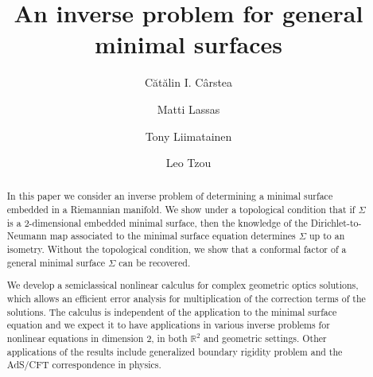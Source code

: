 \documentclass[12pt]{amsart}
\title{An inverse problem for general minimal surfaces}
\author[C. Cârstea]{Cătălin I. Cârstea}
\author[M. Lassas]{Matti Lassas}
\author[T. Liimatainen]{Tony Liimatainen}
\author[L. Tzou]{Leo Tzou}
\def\R{\mathbb R}
\theoremstyle{definition}
\theoremstyle{remark}
\begin{document}
\begin{abstract}
In this paper we consider an inverse problem of determining a minimal surface embedded in a Riemannian manifold.
We show under a topological condition that if $\Sigma$ is a $2$-dimensional embedded minimal surface, then the knowledge of the Dirichlet-to-Neumann map associated to the minimal surface equation determines $\Sigma$ up to an isometry. Without the topological condition, we show that a conformal factor of a general minimal surface $\Sigma$ can be recovered. 

We develop a semiclassical nonlinear calculus for complex geometric optics solutions, 
which allows an efficient error analysis for multiplication of the correction terms of the solutions. 
The calculus is independent of the application to the minimal surface equation and we expect it to have applications in various inverse problems for nonlinear equations in dimension $2$, in both $\R^2$ and geometric settings. Other applications of the results include generalized boundary rigidity problem and the AdS/CFT correspondence in physics.

% 


\end{abstract}
\end{document}
